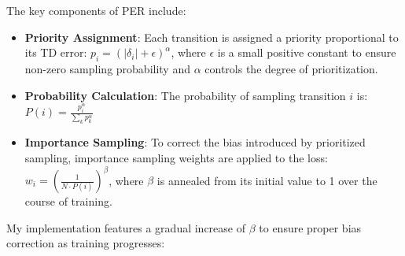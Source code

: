\documentclass[a4paper]{article}
\begin{document}
The key components of PER include:
\begin{itemize}
    \item \textbf{Priority Assignment}: Each transition is assigned a priority proportional to its TD error: $p_i = (|\delta_i| + \epsilon)^\alpha$, where $\epsilon$ is a small positive constant to ensure non-zero sampling probability and $\alpha$ controls the degree of prioritization.
    \item \textbf{Probability Calculation}: The probability of sampling transition $i$ is: $P(i) = \frac{p_i^\alpha}{\sum_k p_k^\alpha}$
    \item \textbf{Importance Sampling}: To correct the bias introduced by prioritized sampling, importance sampling weights are applied to the loss: $w_i = (\frac{1}{N \cdot P(i)})^\beta$, where $\beta$ is annealed from its initial value to 1 over the course of training.
\end{itemize}

My implementation features a gradual increase of $\beta$ to ensure proper bias correction as training progresses:
\end{document}
